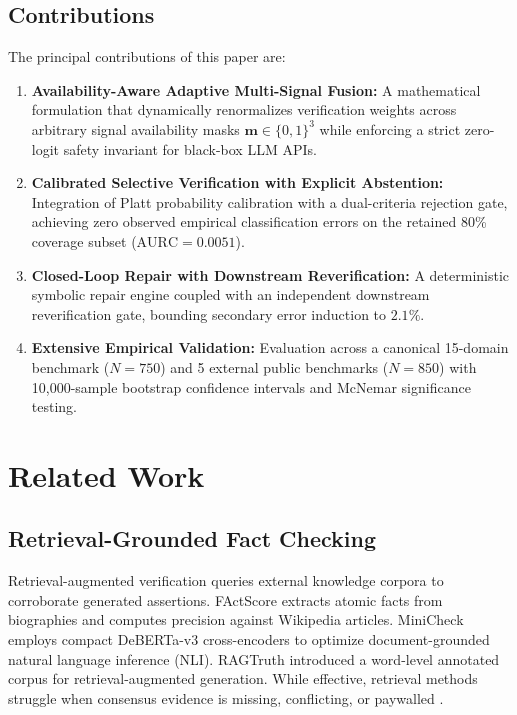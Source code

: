 \documentclass[conference]{IEEEtran}
\begin{document}
\subsection{Contributions}
The principal contributions of this paper are:
\begin{enumerate}
    \item \textbf{Availability-Aware Adaptive Multi-Signal Fusion:} A mathematical formulation that dynamically renormalizes verification weights across arbitrary signal availability masks $\mathbf{m} \in \{0, 1\}^3$ while enforcing a strict zero-logit safety invariant for black-box LLM APIs.
    \item \textbf{Calibrated Selective Verification with Explicit Abstention:} Integration of Platt probability calibration with a dual-criteria rejection gate, achieving zero observed empirical classification errors on the retained 80\% coverage subset ($\text{AURC} = 0.0051$).
    \item \textbf{Closed-Loop Repair with Downstream Reverification:} A deterministic symbolic repair engine coupled with an independent downstream reverification gate, bounding secondary error induction to $2.1\%$.
    \item \textbf{Extensive Empirical Validation:} Evaluation across a canonical 15-domain benchmark ($N=750$) and 5 external public benchmarks ($N=850$) with 10,000-sample bootstrap confidence intervals and McNemar significance testing.
\end{enumerate}

\section{Related Work}
\label{sec:related_work}

\subsection{Retrieval-Grounded Fact Checking}
Retrieval-augmented verification queries external knowledge corpora to corroborate generated assertions. FActScore \cite{min2023factscore} extracts atomic facts from biographies and computes precision against Wikipedia articles. MiniCheck \cite{tang2024minicheck} employs compact DeBERTa-v3 cross-encoders to optimize document-grounded natural language inference (NLI). RAGTruth \cite{niu2024ragtruth} introduced a word-level annotated corpus for retrieval-augmented generation. While effective, retrieval methods struggle when consensus evidence is missing, conflicting, or paywalled \cite{thorne2018fever}.
\end{document}
